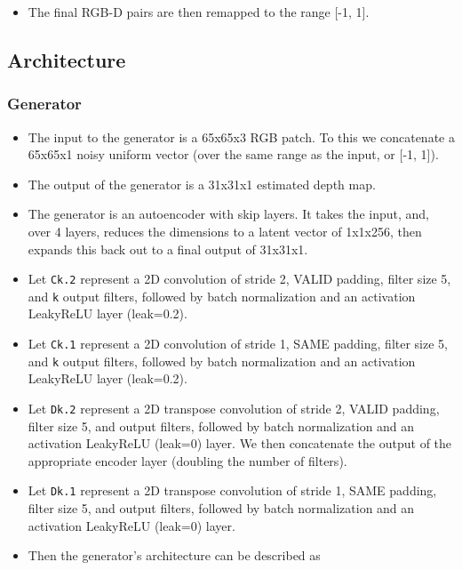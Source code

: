 \documentclass{article}
\begin{document}
\begin{flushleft}
\begin{itemize}
\item The final RGB-D pairs are then remapped to the range [-1, 1].
  \end{itemize}
  
  \subsection{Architecture}



  \subsubsection{Generator}
  \begin{itemize}
  \item The input to the generator is a 65x65x3 RGB patch. To this we concatenate a 65x65x1 noisy uniform vector (over the same range as the input, or [-1, 1]). 
  \item The output of the generator is a 31x31x1 estimated depth map.
  \item The generator is an autoencoder with skip layers. It takes the input, and, over 4 layers, reduces the dimensions to a latent vector of 1x1x256, then expands this back out to a final output of 31x31x1.
  \item Let \texttt{Ck.2} represent a 2D convolution of stride 2, VALID padding, filter size 5, and \texttt{k} output filters, followed by batch normalization and an activation LeakyReLU layer (leak=0.2).
  \item Let \texttt{Ck.1} represent a 2D convolution of stride 1, SAME padding, filter size 5, and \texttt{k} output filters, followed by batch normalization and an activation LeakyReLU layer (leak=0.2).
  \item Let \texttt{Dk.2} represent a 2D transpose convolution of stride 2, VALID padding, filter size 5, and  output filters, followed by batch normalization and an activation LeakyReLU (leak=0) layer. We then concatenate the output of the appropriate encoder layer (doubling the number of filters). 
  \item Let \texttt{Dk.1} represent a 2D transpose convolution of stride 1, SAME padding, filter size 5, and  output filters, followed by batch normalization and an activation LeakyReLU (leak=0) layer.

  \item Then the generator's architecture can be described as


\end{itemize}
\end{flushleft}
\end{document}
